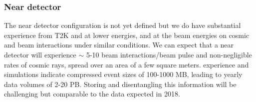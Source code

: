 \subsubsection{ Near detector} The near detector configuration is not yet defined  but we do have substantial experience from T2K and   at lower energies, and   at the   beam energies on cosmic and beam interactions under similar conditions.  We can expect that a near detector will experience $\sim$ 5-10 beam interactions/beam pulse and non-negligible rates of cosmic rays, spread over an area of a few square meters.  experience and  simulations indicate compressed event sizes of 100-1000 MB, leading to yearly data volumes of 2-20 PB.  Storing and disentangling this information will be challenging but comparable to the  data expected in 2018.%




%


